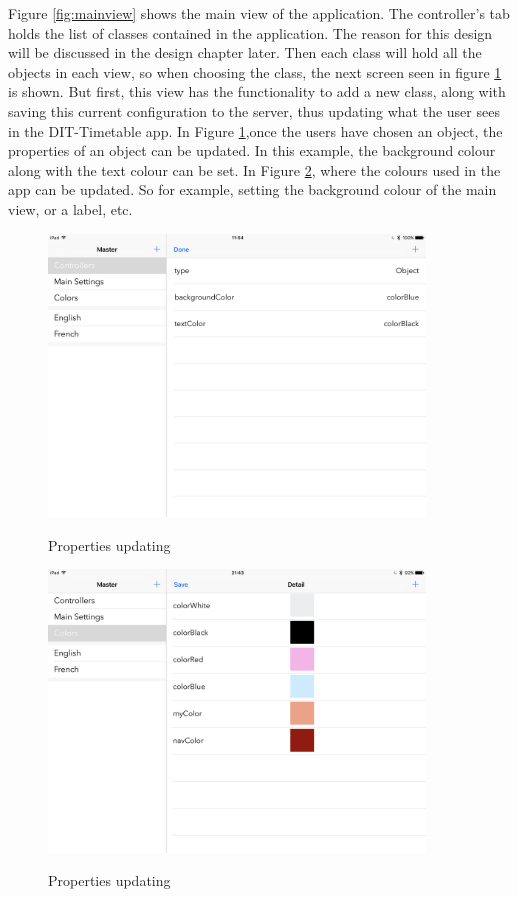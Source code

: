 Figure \ref{fig:mainview} shows the main view of the application. The controller's tab holds the list of classes contained in the application. The reason for this design will be discussed in the design chapter later. Then each class will hold all the objects in each view, so when choosing the class, the next screen seen in figure \ref{fig:update-config} is shown. But first, this view has the functionality to add a new class, along with saving this current configuration to the server, thus updating what the user sees in the DIT-Timetable app. In Figure \ref{fig:update-config},once the users have chosen an object, the properties of an object can be updated. In this example, the background colour along with the text colour can be set. In Figure \ref{fig:config-color}, where the colours used in the app can be updated. So for example, setting the background colour of the main view, or a label, etc.

\begin{figure}[h]
    \caption{Properties updating}
    \centering
    \includegraphics[width=100mm]{images/ipad-images/update}
    \label{fig:update-config}
\end{figure}


\begin{figure}[!h]
    \caption{Properties updating}
    \centering
    \includegraphics[width=100mm]{images/ipad-images/color}
    \label{fig:config-color}
\end{figure}